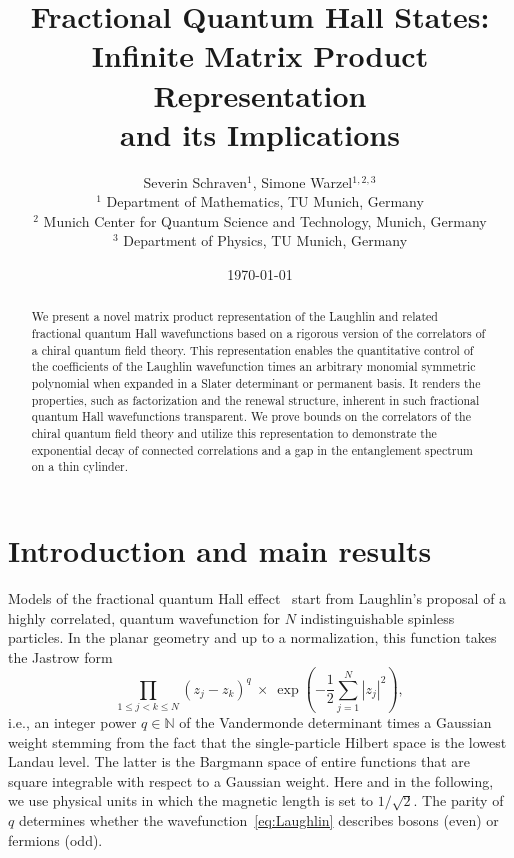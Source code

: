 \documentclass[letterpaper, DIV=17]{scrartcl}
\numberwithin{equation}{section}
\theoremstyle{definition}
\begin{document}
		\title{Fractional Quantum Hall States:\\ Infinite Matrix Product Representation\\ and its Implications}
		
	\author{Severin Schraven$^1$, Simone Warzel$^{1,2,3}$ \\
	\small $^1$ Department of Mathematics, TU Munich, Germany \\[-1ex]
	\small  $^2$ Munich Center for Quantum Science and Technology, Munich, Germany \\[-1ex]
	\small  $^3$ Department of Physics, TU Munich, Germany}
		
		\date{\small\today}	
		\maketitle
		
		
		\begin{abstract}
		\noindent
			We present a novel matrix product representation of the Laughlin and related fractional quantum Hall wavefunctions based on a rigorous version of the correlators of a chiral quantum field theory. This representation enables the quantitative control of the coefficients of the Laughlin wavefunction times an arbitrary monomial symmetric polynomial when expanded in a Slater determinant or permanent basis. It renders the properties, such as factorization and the renewal structure, inherent in such fractional quantum Hall wavefunctions transparent. We prove bounds on the correlators of the chiral quantum field theory and utilize this representation to demonstrate the exponential decay of connected correlations and a gap in the entanglement spectrum on a thin cylinder. 	\end{abstract}

\bigskip
	\tableofcontents
\bigskip
%	




\section{Introduction and main results}

 
Models of the fractional quantum Hall effect~\cite{QHEOxford2003,Simon21} start from Laughlin's proposal \cite{PhysRevLett.50.1395} of a highly correlated, quantum wavefunction for $ N $ indistinguishable spinless particles. 
In the planar geometry and up to a normalization, this function takes the Jastrow form 
\begin{equation}\label{eq:Laughlin}
 \prod_{1\leq j< k \leq N} (z_j-z_k)^q \ \times \ \exp\left( -\frac{1}{2}\sum_{j=1}^N |z_j|^2 \right) , 
\end{equation}
i.e., an integer power $ q \in \mathbb{N} $ of the Vandermonde determinant times a Gaussian weight stemming from the fact that the single-particle Hilbert space is the lowest Landau level. The latter is the Bargmann space of entire functions that are square integrable with respect to a Gaussian weight.
Here and in the following, we use physical units in which the magnetic length is set to $1/\sqrt{2} $. The parity of $ q $ determines whether the wavefunction~\eqref{eq:Laughlin} describes bosons
(even) or fermions (odd). 
\end{document}
